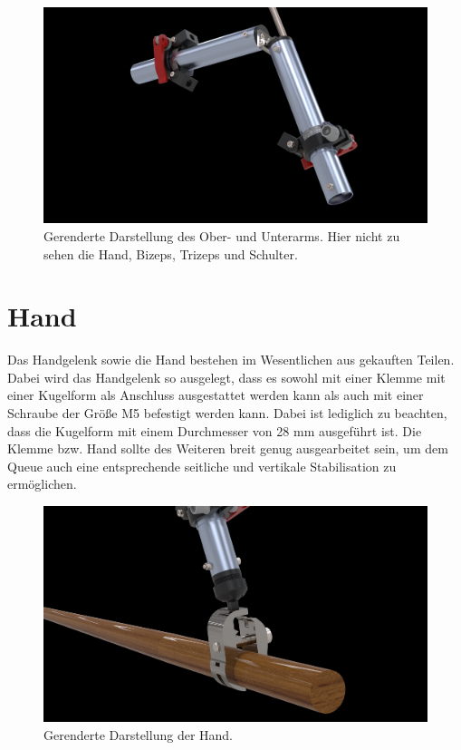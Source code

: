 		\begin{figure}[h]
			\centering
			\includegraphics[width=\textwidth]{Abb/CAD/Renderings/oberarm-unterarm.jpg}
			\caption[Gerenderte Darstellung des Ober- und Unterarms]{Gerenderte Darstellung des Ober- und Unterarms. Hier nicht zu sehen die Hand, Bizeps, Trizeps und Schulter.}%
			\label{fig:rendering oberarm unterarm}
		\end{figure}

	\section{Hand}
		Das Handgelenk sowie die Hand bestehen im Wesentlichen aus gekauften Teilen.
		Dabei wird das Handgelenk so ausgelegt, dass es sowohl mit einer Klemme mit einer Kugelform als Anschluss ausgestattet werden kann als auch mit einer Schraube der Größe M5 befestigt werden kann.
		Dabei ist lediglich zu beachten, dass die Kugelform mit einem Durchmesser von 28 mm ausgeführt ist.
		Die Klemme bzw. Hand sollte des Weiteren breit genug ausgearbeitet sein, um dem Queue auch eine entsprechende seitliche und vertikale Stabilisation zu ermöglichen.

		\begin{figure}[h]
			\centering
			\includegraphics[width=\textwidth]{Abb/CAD/Renderings/hand.jpg}
			\caption[Gerenderte Darstellung der Hand]{Gerenderte Darstellung der Hand.}%
			\label{fig:rendering hand}
		\end{figure}
	
